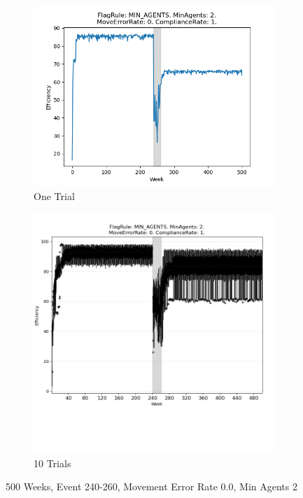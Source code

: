 \documentclass{article}%
\begin{document}
%


\begin{figure}[!htb]%
\begin{subfigure}[b]{0.45\linewidth}%
\includegraphics[width=\linewidth]{2003fr_MIN_AGENTS_ma_2_er_0_cr_1_t1.png}%
\caption{One Trial}%
\end{subfigure}%
\begin{subfigure}[b]{0.45\linewidth}%
\includegraphics[clip,width=\linewidth,trim=0 4cm 0 0]{2003fr_MIN_AGENTS_ma_2_er_0_cr_1_t10.png}%
\caption{10 Trials}%
\end{subfigure}%
\caption{500 Weeks, Event 240{-}260, Movement Error Rate 0.0, Min Agents 2}%
\end{figure}
\end{document}
